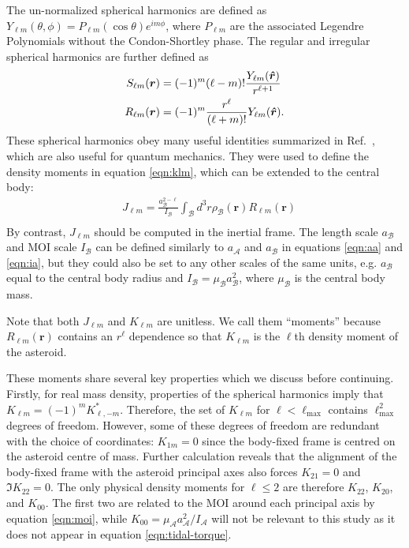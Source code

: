 The un-normalized spherical harmonics are defined as $Y_{\ell m}(\theta, \phi) = P_{\ell m}(\cos \theta)e^{im\phi}$, where $P_{\ell m}$ are the associated Legendre Polynomials without the Condon-Shortley phase. The regular and irregular spherical harmonics are further defined as
\begin{equation}
  \begin{split}
    S_{\ell m}(\bm r) &= (-1)^m (\ell - m)! \frac{Y_{\ell m}(\bm{\hat{r}})}{r^{\ell+1}} \\
    R_{\ell m} (\bm r) &= (-1)^m \frac{r^\ell}{(\ell + m)!} Y_{\ell m}(\bm{\hat{r}}).
  \end{split}
\end{equation}
These spherical harmonics obey many useful identities summarized in Ref.~\cite{Gelderen1998TheSO}, which are also useful for quantum mechanics. They were used to define the density moments in equation \ref{eqn:klm}, which can be extended to the central body:
\begin{equation}
  \begin{split}
    &J_{\ell m} = \frac{a_\mathcal{B}^{2-\ell}}{I_\mathcal{B}} \int_\mathcal{B} d^3 r \rho_\mathcal{B}(\bm r) R_{\ell m}(\bm r)\\
  \end{split}
  \label{eqn:jlm}
\end{equation}
By contrast, $J_{\ell m}$ should be computed in the inertial frame. The length scale $a_\mathcal{B}$ and MOI scale $I_\mathcal{B}$ can be defined similarly to $a_\mathcal{A}$ and $a_\mathcal{B}$ in equations \ref{eqn:aa} and \ref{eqn:ia}, but they could also be set to any other scales of the same units, e.g. $a_\mathcal{B}$ equal to the central body radius and $I_\mathcal{B} = \mu_\mathcal{B}a_\mathcal{B}^2$, where $\mu_\mathcal{B}$ is the central body mass.

Note that both $J_{\ell m}$ and $K_{\ell m}$ are unitless. We call them ``moments'' because $R_{\ell m}(\bm r)$ contains an $r^\ell$ dependence so that $K_{\ell m}$ is the $\ell$th density moment of the asteroid.

These moments share several key properties which we discuss before continuing. Firstly, for real mass density, properties of the spherical harmonics imply that $K_{\ell m} = (-1)^m K_{\ell, -m}^*$. Therefore, the set of $K_{\ell m}$ for $\ell < \ell_\text{max}$ contains $\ell_\text{max}^2$ degrees of freedom. However, some of these degrees of freedom are redundant with the choice of coordinates: $K_{1m} = 0$ since the body-fixed frame is centred on the asteroid centre of mass. Further calculation reveals that the alignment of the body-fixed frame with the asteroid principal axes also forces $K_{21}= 0$ and $\Im K_{22}=0$. The only physical density moments for $\ell \leq 2$ are therefore $K_{22}$, $K_{20}$, and $K_{00}$. The first two are related to the MOI around each principal axis by equation \ref{eqn:moi}, while $K_{00} = \mu_\mathcal{A} a_\mathcal{A}^2 / I_\mathcal{A}$ will not be relevant to this study as it does not appear in equation \ref{eqn:tidal-torque}. 

